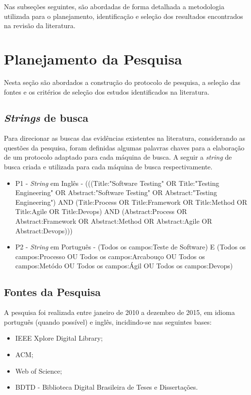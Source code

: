 Nas subseções seguintes, são abordadas de forma detalhada a metodologia utilizada para o planejamento, identificação e seleção dos resultados encontrados na revisão da literatura.

\section{Planejamento da Pesquisa}
\label{sec:planejamentodapesquisa}

Nesta seção são abordados a construção do protocolo de pesquisa, a seleção das fontes e os critérios de seleção dos estudos identificados na literatura.

\subsection{\textit{Strings} de busca}
\label{sec:stringdebusca}

Para direcionar as buscas das evidências existentes na literatura, considerando as questões da pesquisa, foram definidas algumas palavras chaves para a elaboração de um protocolo adaptado para cada máquina de busca. A seguir a \textit{string} de busca criada e utilizada para cada máquina de busca respectivamente.

\begin{itemize}
\item P1 - \textit{String} em Inglês - (((Title:"Software Testing" OR Title:"Testing Engineering" OR Abstract:"Software Testing" OR Abstract:"Testing Engineering") AND (Title:Process OR Title:Framework OR Title:Method OR Title:Agile OR Title:Devops) AND (Abstract:Process OR Abstract:Framework OR Abstract:Method OR Abstract:Agile OR Abstract:Devops)))
\item P2 - \textit{String} em Português -  (Todos os campos:Teste de Software) E (Todos os campos:Processo OU Todos os campos:Arcabouço OU Todos os campos:Metódo OU Todos os campos:Ágil OU Todos os campos:Devops)
\end{itemize}

\subsection{Fontes da Pesquisa}
\label{sec:fontesdapesquisa}

A pesquisa foi realizada entre janeiro de 2010 a dezembro de 2015, em idioma português (quando possível) e inglês, incidindo-se nas seguintes bases:

\begin{itemize}
\item IEEE Xplore Digital Library;
\item ACM;
\item Web of Science;
\item BDTD - Biblioteca Digital Brasileira de Teses e Dissertações.
\end{itemize}

